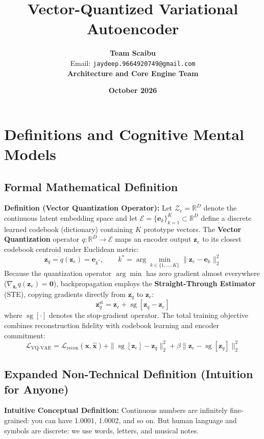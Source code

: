 \documentclass[11pt,a4paper]{article}
\title{\textbf{Vector-Quantized Variational Autoencoder}}
\author{\textbf{Team Scaibu} \\ \small Email: \texttt{jaydeep.9664920749@gmail.com} \\ \small \textbf{Architecture and Core Engine Team}}
\date{\textbf{October 2026}}
\theoremstyle{definition}
\begin{document}
\maketitle

\section{Definitions and Cognitive Mental Models}

\subsection{Formal Mathematical Definition}
\textbf{Definition (Vector Quantization Operator):}
Let $\mathcal{Z}_e = \mathbb{R}^D$ denote the continuous latent embedding space and let $\mathcal{E} = \{\mathbf{e}_k\}_{k=1}^K \subset \mathbb{R}^D$ define a discrete learned codebook (dictionary) containing $K$ prototype vectors. The \textbf{Vector Quantization} operator $q: \mathbb{R}^D \to \mathcal{E}$ maps an encoder output $\mathbf{z}_e$ to its closest codebook centroid under Euclidean metric:
{\boldmath
\begin{equation}
\mathbf{z}_q = q(\mathbf{z}_e) = \mathbf{e}_{k^*}, \qquad k^* = \arg\min_{k \in \{1, \dots, K\}} \|\mathbf{z}_e - \mathbf{e}_k\|_2^2
\end{equation}
}
Because the quantization operator $\arg\min$ has zero gradient almost everywhere ($\nabla_{\mathbf{z}_e} q(\mathbf{z}_e) = \mathbf{0}$), backpropagation employs the \textbf{Straight-Through Estimator} (STE), copying gradients directly from $\mathbf{z}_q$ to $\mathbf{z}_e$:
{\boldmath
\begin{equation}
\mathbf{z}_q^{\text{st}} = \mathbf{z}_e + \operatorname{sg}[\mathbf{z}_q - \mathbf{z}_e]
\end{equation}
}
where $\operatorname{sg}[\cdot]$ denotes the stop-gradient operator. The total training objective combines reconstruction fidelity with codebook learning and encoder commitment:
{\boldmath
\begin{equation}
\mathcal{L}_{\text{VQ-VAE}} = \mathcal{L}_{\text{recon}}(\mathbf{x}, \hat{\mathbf{x}}) + \|\operatorname{sg}[\mathbf{z}_e] - \mathbf{z}_q\|_2^2 + \beta \|\mathbf{z}_e - \operatorname{sg}[\mathbf{z}_q]\|_2^2
\end{equation}
}

\subsection{Expanded Non-Technical Definition (Intuition for Anyone)}
\textbf{Intuitive Conceptual Definition:}
Continuous numbers are infinitely fine-grained: you can have 1.0001, 1.0002, and so on. But human language and symbols are discrete: we use words, letters, and musical notes. 
\end{document}
